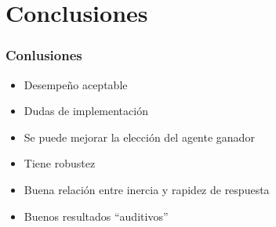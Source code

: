 \documentclass[slidestop,compress,mathserif,xcolor=svgnames,table,xcolor=dvipsnames]{beamer}
\begin{document}
\begin{frame}
\begin{columns}
\begin{scriptsize}
\end{scriptsize}
\end{columns}



\end{frame}

\section{Conclusiones}
\begin{frame}
\frametitle{Conlusiones}
\begin{scriptsize}
\vspace*{30pt}
\begin{itemize}
  \item<1-> \alert<1>{Desempeño aceptable} 
  \vspace*{10pt}
  \item<2-> \alert<2>{Dudas de implementación}
  \vspace*{10pt}
  \item<3-> \alert<3>{Se puede mejorar la elección del agente ganador}
  \vspace*{10pt}
  \item<4-> \alert<4>{Tiene robustez}
  \vspace*{10pt}
  \item<5-> \alert<5>{Buena relación entre inercia y rapidez de respuesta}
  \vspace*{10pt}
  \item<6-> \alert<6>{Buenos resultados ``auditivos''}
\end{itemize}


\end{scriptsize}

\end{frame}
\end{document}
